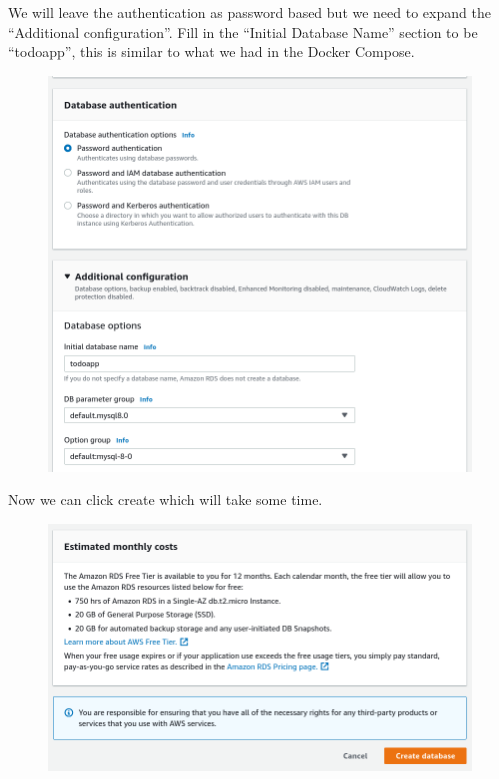 \documentclass{csse4400}
\begin{document}
We will leave the authentication as password based but we need to expand the ``Additional configuration''.
Fill in the ``Initial Database Name'' section to be ``todoapp'',
this is similar to what we had in the Docker Compose.


\begin{figure}[H]
  \includegraphics[width=\textwidth]{images/db7}
\end{figure}

Now we can click create which will take some time.

\begin{figure}[H]
  \includegraphics[width=\textwidth]{images/db8}
\end{figure}
\end{document}
